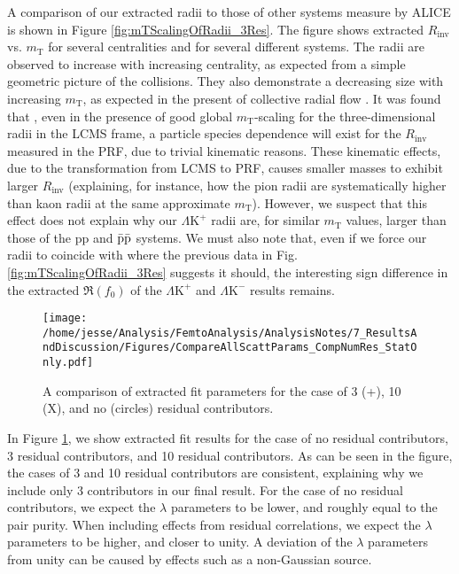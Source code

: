 \documentclass[ALICE,manyauthors]{cernphprep}
\newcommand{\mt}{$m_{\mathrm{T}}$\xspace}
\newcommand{\LamKchP}{$\Lambda\mathrm{K^{+}}$\xspace}
\newcommand{\LamKchM}{$\Lambda\mathrm{K^{-}}$\xspace}
\begin{document}
A comparison of our extracted radii to those of other systems measure by ALICE \cite{Adam:2015vja} is shown in Figure \ref{fig:mTScalingOfRadii_3Res}.  
The figure shows extracted $R_{\mathrm{inv}}$ vs. \mt for several centralities and for several different systems.
The radii are observed to increase with increasing centrality, as expected from a simple geometric picture of the collisions.
They also demonstrate a decreasing size with increasing \mt, as expected in the present of collective radial flow \cite{Akkelin:1995gh}.
It was found that \cite{Kisiel:2014upa}, even in the presence of good global \mt-scaling for the three-dimensional radii in the LCMS frame, a particle species dependence will exist for the $R_{\mathrm{inv}}$ measured in the PRF, due to trivial kinematic reasons.
These kinematic effects, due to the transformation from LCMS to PRF, causes smaller masses to exhibit larger $R_{\mathrm{inv}}$ \cite{Adam:2015vja} (explaining, for instance, how the pion radii are systematically higher than kaon radii at the same approximate \mt).
However, we suspect that this effect does not explain why our \LamKchP radii are, for similar \mt values, larger than those of the pp and $\rm \bar{p}\bar{p}$ systems. 
We must also note that, even if we force our radii to coincide with where the previous data in Fig. \ref{fig:mTScalingOfRadii_3Res} suggests it should, the interesting sign difference in the extracted $\Re(f_{0})$ of the \LamKchP and \LamKchM results remains.


\begin{figure}[h]
  \centering
  \texttt{[image: /home/jesse/Analysis/FemtoAnalysis/AnalysisNotes/7\_ResultsAndDiscussion/Figures/CompareAllScattParams\_CompNumRes\_StatOnly.pdf]}
  \caption[Compare Fit Parameters: Number of residuals]{A comparison of extracted fit parameters for the case of 3 (+), 10 (X), and no (circles) residual contributors.}
  \label{fig:CompareAllScattParams_CompNumRes}
\end{figure}

In Figure \ref{fig:CompareAllScattParams_CompNumRes}, we show extracted fit results for the case of no residual contributors, 3 residual contributors, and 10 residual contributors.
As can be seen in the figure, the cases of 3 and 10 residual contributors are consistent, explaining why we include only 3 contributors in our final result.
For the case of no residual contributors, we expect the $\lambda$ parameters to be lower, and roughly equal to the pair purity.
When including effects from residual correlations, we expect the $\lambda$ parameters to be higher, and closer to unity.
A deviation of the $\lambda$ parameters from unity can be caused by effects such as a non-Gaussian source.
\end{document}
